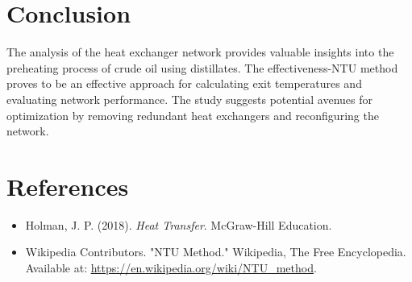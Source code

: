 \documentclass[12pt]{article}
\begin{document}
\section{Conclusion}
The analysis of the heat exchanger network provides valuable insights into the preheating process of crude oil using distillates. The effectiveness-NTU method proves to be an effective approach for calculating exit temperatures and evaluating network performance. The study suggests potential avenues for optimization by removing redundant heat exchangers and reconfiguring the network.

\section{References}
\begin{itemize}
    \item Holman, J. P. (2018). \textit{Heat Transfer}. McGraw-Hill Education.
    \item Wikipedia Contributors. "NTU Method." Wikipedia, The Free Encyclopedia. Available at: \url{https://en.wikipedia.org/wiki/NTU_method}.
\end{itemize}
\end{document}
